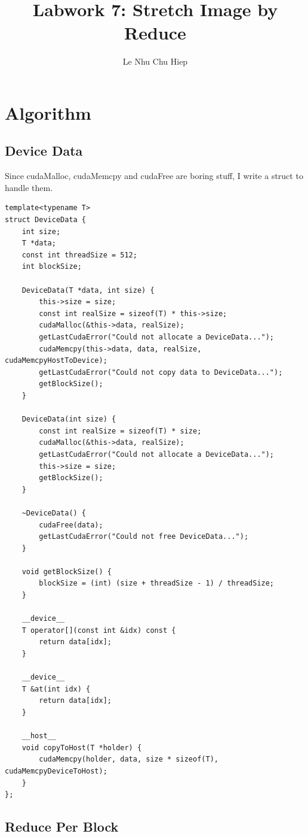 \documentclass{article}
\title{Labwork 7: Stretch Image by Reduce}
\author{Le Nhu Chu Hiep}
\begin{document}
\maketitle

\section{Algorithm}

\subsection{Device Data}

Since cudaMalloc, cudaMemcpy and cudaFree are boring stuff, I write a struct to handle them.

\begin{Verbatim}[fontsize=\small]
template<typename T>
struct DeviceData {
    int size;
    T *data;
    const int threadSize = 512;
    int blockSize;

    DeviceData(T *data, int size) {
        this->size = size;
        const int realSize = sizeof(T) * this->size;
        cudaMalloc(&this->data, realSize);
        getLastCudaError("Could not allocate a DeviceData...");
        cudaMemcpy(this->data, data, realSize, cudaMemcpyHostToDevice);
        getLastCudaError("Could not copy data to DeviceData...");
        getBlockSize();
    }

    DeviceData(int size) {
        const int realSize = sizeof(T) * size;
        cudaMalloc(&this->data, realSize);
        getLastCudaError("Could not allocate a DeviceData...");
        this->size = size;
        getBlockSize();
    }

    ~DeviceData() {
        cudaFree(data);
        getLastCudaError("Could not free DeviceData...");
    }

    void getBlockSize() {
        blockSize = (int) (size + threadSize - 1) / threadSize;
    }

    __device__
    T operator[](const int &idx) const {
        return data[idx];
    }

    __device__
    T &at(int idx) {
        return data[idx];
    }

    __host__
    void copyToHost(T *holder) {
        cudaMemcpy(holder, data, size * sizeof(T), cudaMemcpyDeviceToHost);
    }
};
\end{Verbatim}

\subsection{Reduce Per Block}
\end{document}
